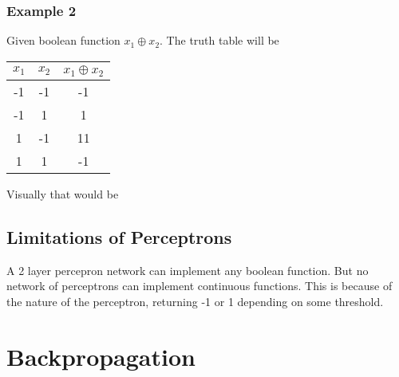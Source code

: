 \documentclass[10pt,a4paper]{article}
\begin{document}
\subsubsection{Example 2}
Given boolean function $x_1\oplus x_2$. The truth table will be

\begin{tabular}{|c|c|c|}
\hline
$x_1$ & $x_2$ & $x_1\oplus x_2$ \\
\hline
-1 & -1 & -1 \\
-1 & 1 & 1 \\
1 & -1 & 11 \\
1 & 1 & -1 \\
\hline
\end{tabular}

Visually that would be

\begin{center}
\end{center}












 
\subsection{Limitations of Perceptrons}

A 2 layer percepron network can implement any boolean function. But no network of perceptrons can implement continuous functions. This is because of the nature of the perceptron, returning -1 or 1 depending on some threshold.

\citep{Michell2009}
\section{Backpropagation}
\end{document}

